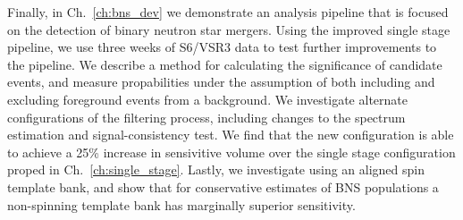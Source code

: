 Finally, in Ch.~\ref{ch:bns_dev} we demonstrate an analysis pipeline
that is focused on the detection of binary neutron star mergers. Using the 
improved single stage pipeline, we use three weeks of S6/VSR3 data to test 
further improvements to the pipeline. We describe a method for calculating
the significance of candidate events, and measure propabilities under the
assumption of both including and excluding foreground events from a background.
We investigate alternate configurations of the filtering process, including changes
to the spectrum estimation and signal-consistency test. We find that
the new configuration is able to achieve a 25\% increase in sensivitive volume over the
single stage configuration proped in Ch.~\ref{ch:single_stage}. Lastly,
we investigate using an aligned spin template bank, and show that for conservative 
estimates of BNS populations a non-spinning template bank has marginally superior 
sensitivity.



